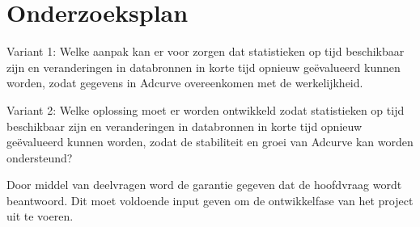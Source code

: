 \chapter{Onderzoeksplan}

Variant 1:
Welke aanpak kan er voor zorgen dat statistieken op tijd beschikbaar zijn en veranderingen in databronnen in korte tijd opnieuw geëvalueerd kunnen worden, zodat gegevens in Adcurve overeenkomen met de werkelijkheid.

Variant 2:
Welke oplossing moet er worden ontwikkeld zodat statistieken op tijd beschikbaar zijn en veranderingen in databronnen in korte tijd opnieuw geëvalueerd kunnen worden, zodat de stabiliteit en groei van Adcurve kan worden ondersteund?

Door middel van deelvragen word de garantie gegeven dat de hoofdvraag wordt beantwoord. Dit moet voldoende input geven om de ontwikkelfase van het project uit te voeren.

